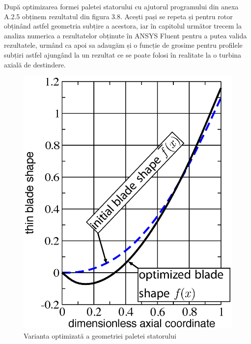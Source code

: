 După optimizarea formei paletei statorului cu ajutorul programului din anexa A.2.5 obținem rezultatul din figura 3.8. Acești pași se repeta și pentru rotor obținând astfel geometria subțire a acestora, iar în capitolul următor trecem la analiza numerica a rezultatelor obținute în ANSYS Fluent pentru a putea valida rezultatele, urmând ca apoi sa adaugăm și o funcție de grosime pentru profilele subțiri astfel ajungând la un rezultat ce se poate folosi în realitate la o turbina axială de destindere.

\begin{figure}[h]
	\centering
	\includegraphics[scale=0.4]{figures/stator_optimized_blade.eps}
	\caption{Varianta optimizată a geometriei paletei statorului}
	\label{Varianta optimizată a geometriei paletei statorului}
\end{figure}

\clearpage